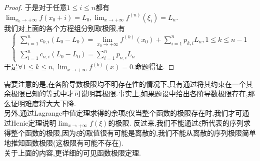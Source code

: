 \documentclass{ctexart}
\begin{document}
\begin{proof}
    于是对于任意$1\leqslant i\leqslant n$都有$\displaystyle\lim_{x_0\to+\infty}f(x_0+i)=L_0,\lim_{x\to+\infty}f^{(n)}(\xi_i)=L_n$.\\
    我们对上面的各个方程组分别取极限,有
    $$\left\{\begin{array}{l}
        \displaystyle\sum_{i=1}^{n}c_{k,i}\left(L_0-L_0\right)=\lim_{x_0\to+\infty}f^{(k)}(x_0)+\sum_{i=1}^{n}p_{k,i}L_n,1\leqslant k\leqslant n-1\\
        \displaystyle\sum_{i=1}^{n}{c_{n,i}}\left(L_0-L_0\right)=\sum_{i=1}^{n}p_{n,i}L_n
    \end{array}\right.$$
    于是$\forall 1\leqslant k\leqslant n,\displaystyle\lim_{x\to+\infty}f^{(k)}(x)=0$.命题得证.
\end{proof}\noindent
需要注意的是,在各阶导数极限均不明存在性的情况下,只有通过将其约束在一个其余极限已知的等式中才可说明其极限.事实上,如果题设中给出各阶导数极限存在,那么证明难度将大大下降.\\
另外,通过Lagrange中值定理求得的余项$\xi$仅当整个函数的极限存在时,我们才可通过Henie定理说明$\lim_{x\to+\infty}f(\xi)$的极限.%
反过来,我们不能通过$\xi$所代表的序列求得整个函数的极限,因为$\xi$的取值很有可能是离散的,我们不能从离散的序列极限简单地推知函数极限(这极限有可能不存在).\\
关于上面的内容,更详细的可见函数极限定理.
\end{document}
